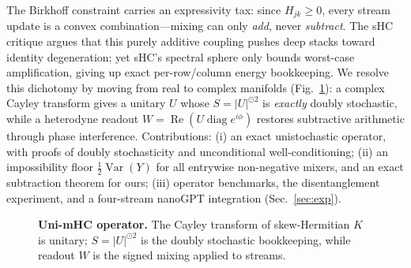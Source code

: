 \documentclass{article}
\begin{document}
The Birkhoff constraint carries an expressivity tax: since $H_{jk}\ge 0$, every
stream update is a convex combination---mixing can only \emph{add}, never
\emph{subtract}. The sHC critique \citep{shc2026} argues that this purely additive
coupling pushes deep stacks toward identity degeneration; yet sHC's spectral sphere
only bounds worst-case amplification, giving up exact per-row/column energy
bookkeeping.
We resolve this dichotomy by moving from real to complex manifolds
(Fig.~\ref{fig:schematic}): a complex Cayley transform gives a unitary $U$ whose
$S=|U|^{\odot2}$ is \emph{exactly} doubly stochastic, while a heterodyne readout
$W=\operatorname{Re}(U\operatorname{diag}e^{i\phi})$ restores subtractive
arithmetic through phase interference. Contributions: (i) an exact unistochastic
operator, with proofs of doubly stochasticity and unconditional well-conditioning;
(ii) an impossibility floor $\tfrac12\operatorname{Var}(Y)$ for all entrywise
non-negative mixers, and an exact subtraction theorem for ours; (iii) operator
benchmarks, the disentanglement experiment, and a four-stream nanoGPT integration
(Sec.~\ref{sec:exp}).

\begin{figure}[t]
\centering
{}
\caption{\textbf{Uni-mHC operator.} The Cayley transform of skew-Hermitian $K$ is
unitary; $S=|U|^{\odot2}$ is the doubly stochastic bookkeeping, while readout $W$
is the signed mixing applied to streams.}
\label{fig:schematic}
\end{figure}
\end{document}

